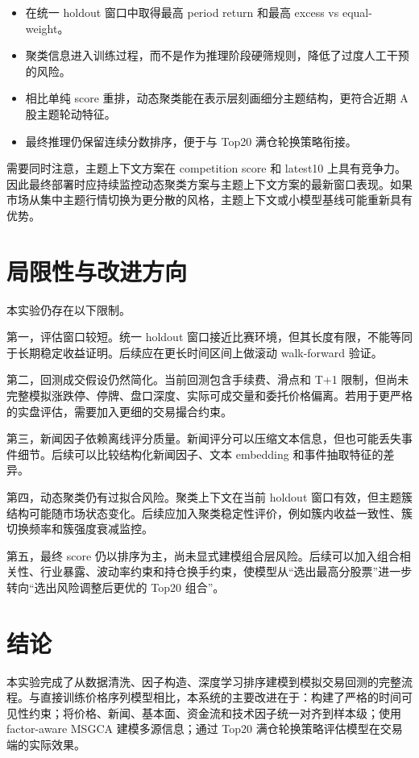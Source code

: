 \documentclass[UTF8,a4paper,12pt,fontset=none]{ctexart}
\begin{document}
\begin{itemize}
  \item 在统一 holdout 窗口中取得最高 period return 和最高 excess vs equal-weight。
  \item 聚类信息进入训练过程，而不是作为推理阶段硬筛规则，降低了过度人工干预的风险。
  \item 相比单纯 score 重排，动态聚类能在表示层刻画细分主题结构，更符合近期 A 股主题轮动特征。
  \item 最终推理仍保留连续分数排序，便于与 Top20 满仓轮换策略衔接。
\end{itemize}

需要同时注意，主题上下文方案在 competition score 和 latest10 上具有竞争力。因此最终部署时应持续监控动态聚类方案与主题上下文方案的最新窗口表现。如果市场从集中主题行情切换为更分散的风格，主题上下文或小模型基线可能重新具有优势。

\section{局限性与改进方向}

本实验仍存在以下限制。

第一，评估窗口较短。统一 holdout 窗口接近比赛环境，但其长度有限，不能等同于长期稳定收益证明。后续应在更长时间区间上做滚动 walk-forward 验证。

第二，回测成交假设仍然简化。当前回测包含手续费、滑点和 T+1 限制，但尚未完整模拟涨跌停、停牌、盘口深度、实际可成交量和委托价格偏离。若用于更严格的实盘评估，需要加入更细的交易撮合约束。

第三，新闻因子依赖离线评分质量。新闻评分可以压缩文本信息，但也可能丢失事件细节。后续可以比较结构化新闻因子、文本 embedding 和事件抽取特征的差异。

第四，动态聚类仍有过拟合风险。聚类上下文在当前 holdout 窗口有效，但主题簇结构可能随市场状态变化。后续应加入聚类稳定性评价，例如簇内收益一致性、簇切换频率和簇强度衰减监控。

第五，最终 score 仍以排序为主，尚未显式建模组合层风险。后续可以加入组合相关性、行业暴露、波动率约束和持仓换手约束，使模型从“选出最高分股票”进一步转向“选出风险调整后更优的 Top20 组合”。

\section{结论}

本实验完成了从数据清洗、因子构造、深度学习排序建模到模拟交易回测的完整流程。与直接训练价格序列模型相比，本系统的主要改进在于：构建了严格的时间可见性约束；将价格、新闻、基本面、资金流和技术因子统一对齐到样本级；使用 factor-aware MSGCA 建模多源信息；通过 Top20 满仓轮换策略评估模型在交易端的实际效果。
\end{document}
